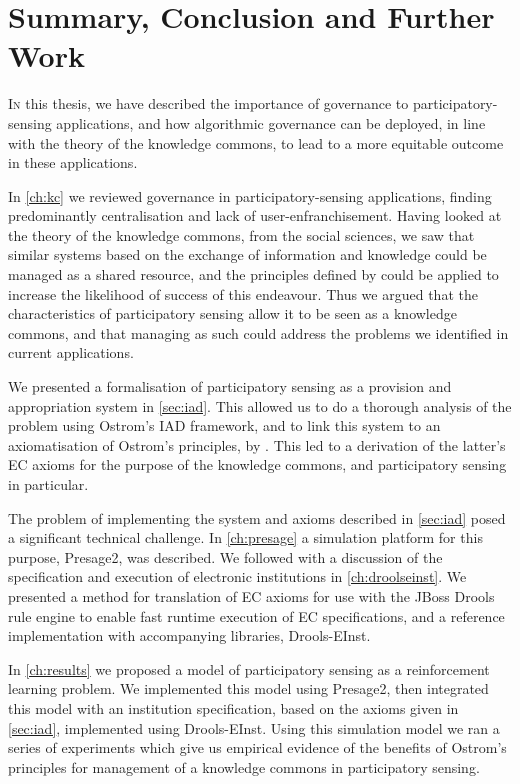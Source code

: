 \acresetall
\chapter{Summary, Conclusion and Further Work}

\lettrine[lines=3]{I}{n} this thesis, we have described the importance of
governance to participatory-sensing applications, and how algorithmic
governance can be deployed, in line with the theory of the knowledge commons,
to lead to a more equitable outcome in these applications.

In \autoref{ch:kc} we reviewed governance in participatory-sensing
applications, finding predominantly centralisation and lack of 
user-enfranchisement. Having looked at the theory of the knowledge commons, from
the social sciences, we saw that similar systems based on the exchange of
information and knowledge could be managed as a shared resource, and the
principles defined by \citet{Ostrom1990} could be applied to increase the
likelihood of success of this endeavour. Thus we argued that the
characteristics of participatory sensing allow it to be seen as a knowledge
commons, and that managing as such could address the problems we identified in
current applications.

We presented a formalisation of participatory sensing as a provision and
appropriation system in \autoref{sec:iad}. This allowed us to do a thorough
analysis of the problem using Ostrom's \ac{IAD} framework, and to link this
system to an axiomatisation of Ostrom's principles, by \citet{Pitt2012b}. This
led to a derivation of the latter's \ac{EC} axioms for the purpose of the
knowledge commons, and participatory sensing in particular.

The problem of implementing the system and axioms described in
\autoref{sec:iad} posed a significant technical challenge. In
\autoref{ch:presage} a simulation platform for this purpose, Presage2, was
described. We followed with a discussion of the specification and execution of
electronic institutions in \autoref{ch:droolseinst}. We presented a method for
translation of \ac{EC} axioms for use with the JBoss Drools rule engine to
enable fast runtime execution of \ac{EC} specifications, and a reference
implementation with accompanying libraries, Drools-EInst.

In \autoref{ch:results} we proposed a model of participatory sensing as a
reinforcement learning problem. We implemented this model using Presage2, then
integrated this model with an institution specification, based on the axioms
given in \autoref{sec:iad}, implemented using Drools-EInst. Using this
simulation model we ran a series of experiments which give us empirical
evidence of the benefits of Ostrom's principles for management of a knowledge
commons in participatory sensing.

